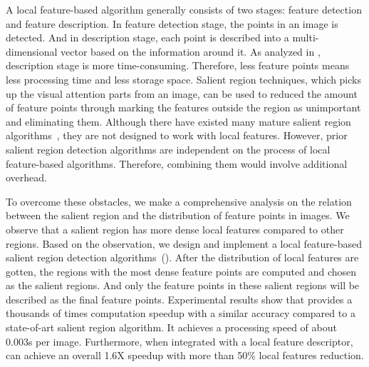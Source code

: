 A local feature-based algorithm generally consists of two stages: feature detection and feature description. In feature detection stage, the points in  an image is detected. And in description stage, each point is described into a multi-dimensional vector based on the information around it. As analyzed in \cite{adaptivepipelineicpp2012}, description stage is more time-consuming. Therefore, less feature points means  less processing time and less storage space. Salient region techniques, which picks up the visual attention parts from an image, can be used to reduced the amount of feature points through marking the features outside the region as unimportant and eliminating them. Although there have existed many mature salient region algorithms~\cite{cheng2011global,achanta2009frequency,itti1998model}, they are not designed to work with local features. However, prior salient region detection algorithms are independent on the process of local feature-based algorithms. Therefore,  combining them would involve additional overhead.


To overcome these obstacles, we make a comprehensive analysis on the relation between the salient region and the distribution of feature points  in images. We observe that a salient region has more dense local features compared to other regions. Based on the observation, we design and implement a local feature-based salient region detection algorithms~({\sys}). After the distribution of local features are gotten, the regions with the most dense feature points are computed and chosen as the salient regions. And only the feature points in these salient regions will be described as the final feature points.  Experimental results show that {\sys} provides a thousands of times computation speedup with a similar accuracy compared to a state-of-art salient region algorithm. It achieves a processing speed of about 0.003s per image. Furthermore, when integrated with a local feature descriptor, {\sys} can achieve an overall 1.6X speedup with more than 50\% local features reduction.




